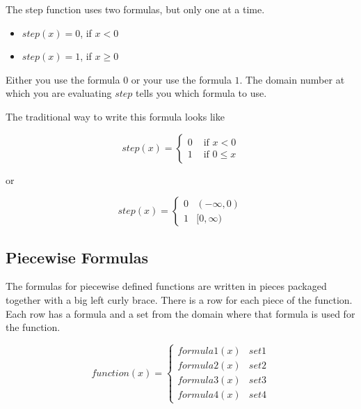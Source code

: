 \documentclass{ximera}
\begin{document}
The step function uses two formulas, but only one at a time.  

\begin{itemize}
\item $step(x) = 0$, if $x < 0$ 
\item $step(x) = 1$, if $x \geq 0$
\end{itemize}  


Either you use the formula $0$ or your use the formula $1$.  The domain number at which you are evaluating $step$ tells you which formula to use.


The traditional way to write this formula looks like

\[
step(x) = 
\begin{cases}
  0 & \text{ if } x < 0 \\
  1 & \text{ if } 0 \leq x
\end{cases}
\]


or


\[
step(x) = 
\begin{cases}
  0 & (-\infty, 0) \\
  1 & [0, \infty)
\end{cases}
\]





















\subsection*{Piecewise Formulas}



The formulas for piecewise defined functions are written in pieces packaged together with a big left curly brace.  There is a row for each piece of the function.  Each row has a formula and a set from the domain where that formula is used for the function.





\[
function(x) = 
\begin{cases}
  formula1(x) & set1 \\
  formula2(x) & set2 \\
  formula3(x) & set3 \\
  formula4(x) & set4
\end{cases}
\]
\end{document}
